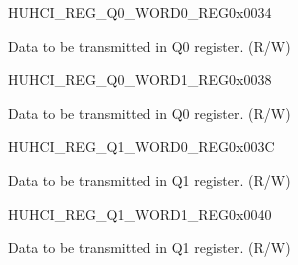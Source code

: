 \begin{register}{H}{UHCI\_REG\_Q0\_WORD0\_REG}{0x0034}\label{regdesc:UHCIREGQ0WORD0REG}
%
\regnewline%
\begin{regdesc}\begin{reglist}
\label{fielddesc:UHCISENDQ0WORD0}\item [UHCI\_SEND\_Q0\_WORD0] Data to be transmitted in Q0 register. (R/W)
\end{reglist}\end{regdesc}
\end{register}


\begin{register}{H}{UHCI\_REG\_Q0\_WORD1\_REG}{0x0038}\label{regdesc:UHCIREGQ0WORD1REG}
%
\regnewline%
\begin{regdesc}\begin{reglist}
\label{fielddesc:UHCISENDQ0WORD1}\item [UHCI\_SEND\_Q0\_WORD1] Data to be transmitted in Q0 register. (R/W)
\end{reglist}\end{regdesc}
\end{register}


\begin{register}{H}{UHCI\_REG\_Q1\_WORD0\_REG}{0x003C}\label{regdesc:UHCIREGQ1WORD0REG}
%
\regnewline%
\begin{regdesc}\begin{reglist}
\label{fielddesc:UHCISENDQ1WORD0}\item [UHCI\_SEND\_Q1\_WORD0] Data to be transmitted in Q1 register. (R/W)
\end{reglist}\end{regdesc}
\end{register}


\begin{register}{H}{UHCI\_REG\_Q1\_WORD1\_REG}{0x0040}\label{regdesc:UHCIREGQ1WORD1REG}
%
\regnewline%
\begin{regdesc}\begin{reglist}
\label{fielddesc:UHCISENDQ1WORD1}\item [UHCI\_SEND\_Q1\_WORD1] Data to be transmitted in Q1 register. (R/W)
\end{reglist}\end{regdesc}
\end{register}



